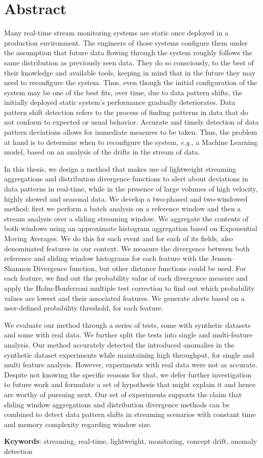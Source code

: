 \chapter*{Abstract}

Many real-time stream monitoring systems are static once deployed in a production environment. The engineers of those systems configure them under the assumption that future data flowing through the system roughly follows the same distribution as previously seen data. They do so consciously, to the best of their knowledge and available tools, keeping in mind that in the future they may need to reconfigure the system. Thus, even though the initial configuration of the system may be one of the best fits, over time, due to data pattern shifts, the initially deployed static system's performance gradually deteriorates. Data pattern shift detection refers to the process of finding patterns in data that do not conform to expected or usual behavior. Accurate and timely detection of data pattern deviations allows for immediate measures to be taken. Thus, the problem at hand is to determine when to reconfigure the system, \textit{e.g.}, a Machine Learning model, based on an analysis of the drifts in the stream of data.

In this thesis, we design a method that makes use of lightweight streaming aggregations and distribution divergence functions to alert about deviations in data patterns in real-time, while in the presence of large volumes of high velocity, highly skewed and seasonal data. We develop a two-phased and two-windowed method: first we perform a batch analysis on a reference window and then a stream analysis over a sliding streaming window. We aggregate the contents of both windows using an approximate histogram aggregation based on Exponential Moving Averages. We do this for each event and for each of its fields, also denominated features in our context. We measure the divergence between both reference and sliding window histograms for each feature with the Jensen–Shannon Divergence function, but other distance functions could be used. For each feature, we find out the probability value of each divergence measure and apply the Holm-Bonferroni multiple test correction to find out which probability values are lowest and their associated features. We generate alerts based on a user-defined probability threshold, for each feature.

We evaluate our method through a series of tests, some with synthetic datasets and some with real data. We further split the tests into single and multi-feature analysis. Our method accurately detected the introduced anomalies in the synthetic dataset experiments while maintaining high throughput, for single and multi feature analysis. However, experiments with real data were not as accurate. Despite not knowing the specific reasons for that, we defer further investigation to future work and formulate a set of hypothesis that might explain it and hence are worthy of pursuing next. Our set of experiments supports the claim that sliding window aggregations and distribution divergence methods can be combined to detect data pattern shifts in streaming scenarios with constant time and memory complexity regarding window size.

\vspace*{10mm}\noindent
\textbf{Keywords}: streaming, real-time, lightweight, monitoring, concept drift, anomaly detection

